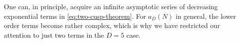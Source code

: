 \documentclass[11pt]{amsart}
\numberwithin{equation}{section}
\newtheorem{thm}{Theorem}[section]
\newtheorem{conj}[thm]{Conjecture}
\theoremstyle{remark}
\newtheorem{rem}[thm]{Remark}
\begin{document}
One can, in principle, acquire an infinite asymptotic series of decreasing exponential terms in \eqref{eq:two-cusp-theorem}. For $a_D(N)$ in general, the lower order terms become rather complex, which is why we have restricted our attention to just two terms in the $D=5$ case.

\end{document}
